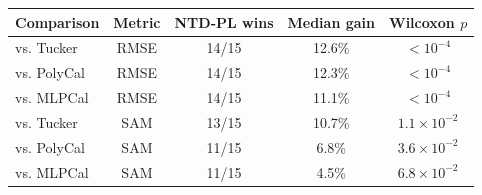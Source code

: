 \begin{tabular}{@{}l c c c c@{}}
\toprule
Comparison & Metric & NTD-PL wins & Median gain & Wilcoxon \(p\) \\
\midrule
vs. Tucker & RMSE & 14/15 & 12.6\% & \(<10^{-4}\) \\
vs. PolyCal & RMSE & 14/15 & 12.3\% & \(<10^{-4}\) \\
vs. MLPCal & RMSE & 14/15 & 11.1\% & \(<10^{-4}\) \\
vs. Tucker & SAM & 13/15 & 10.7\% & \(1.1\times10^{-2}\) \\
vs. PolyCal & SAM & 11/15 & 6.8\% & \(3.6\times10^{-2}\) \\
vs. MLPCal & SAM & 11/15 & 4.5\% & \(6.8\times10^{-2}\) \\
\bottomrule
\end{tabular}
